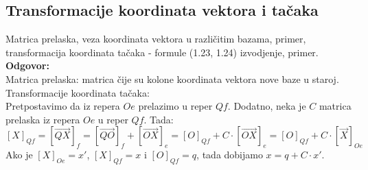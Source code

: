 \documentclass[12pt]{article}
\begin{document}
    \par
    \subsection{Transformacije koordinata vektora i tačaka}
    Matrica prelaska, veza koordinata vektora u različitim bazama,
    primer, transformacija koordinata tačaka - formule (1.23, 1.24)
    izvodjenje, primer.\\
    \textbf{Odgovor:}\\
    Matrica prelaska: matrica čije su kolone koordinata vektora nove baze u staroj.\\
    Transformacije koordinata tačaka:\\
    Pretpostavimo da iz repera $Oe$ prelazimo u reper $Qf$. Dodatno, neka je
$C$ matrica prelaska iz repera $Oe$ u reper $Qf$. Tada:
    $$[X]_{Qf}  =[\overrightarrow{QX}]_f =[\overrightarrow{QO}]_f+[\overrightarrow{OX}]_e =[O]_{Qf}+C\cdot[\overrightarrow{OX}]_e =[O]_{Qf}+C\cdot[\overrightarrow{X}]_{Oe}$$
    Ako je $[X]_{Oe}=x'$, $[X]_{Qf}=x$ i $[O]_{Qf}=q$, tada dobijamo $x=q+C\cdot x'$.
    \par
\end{document}
